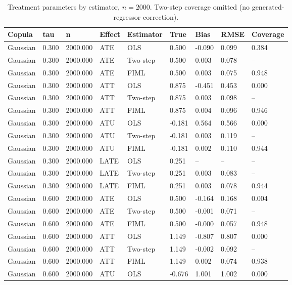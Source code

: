 \begin{table}[htbp]\centering\small
\caption{Treatment parameters by estimator, $n = 2000$. Two-step coverage omitted (no generated-regressor correction).}\label{tab:mc-te}
\begin{tabular}{lllllllll}
\hline
Copula & tau & n & Effect & Estimator & True & Bias & RMSE & Coverage
\\ \hline
Gaussian & 0.300 & 2000.000 & ATE & OLS & 0.500 & -0.090 & 0.099 & 0.384 \\
Gaussian & 0.300 & 2000.000 & ATE & Two-step & 0.500 & 0.003 & 0.078 & -- \\
Gaussian & 0.300 & 2000.000 & ATE & FIML & 0.500 & 0.003 & 0.075 & 0.948 \\
Gaussian & 0.300 & 2000.000 & ATT & OLS & 0.875 & -0.451 & 0.453 & 0.000 \\
Gaussian & 0.300 & 2000.000 & ATT & Two-step & 0.875 & 0.003 & 0.098 & -- \\
Gaussian & 0.300 & 2000.000 & ATT & FIML & 0.875 & 0.004 & 0.096 & 0.946 \\
Gaussian & 0.300 & 2000.000 & ATU & OLS & -0.181 & 0.564 & 0.566 & 0.000 \\
Gaussian & 0.300 & 2000.000 & ATU & Two-step & -0.181 & 0.003 & 0.119 & -- \\
Gaussian & 0.300 & 2000.000 & ATU & FIML & -0.181 & 0.002 & 0.110 & 0.944 \\
Gaussian & 0.300 & 2000.000 & LATE & OLS & 0.251 & -- & -- & -- \\
Gaussian & 0.300 & 2000.000 & LATE & Two-step & 0.251 & 0.003 & 0.083 & -- \\
Gaussian & 0.300 & 2000.000 & LATE & FIML & 0.251 & 0.003 & 0.078 & 0.944 \\
Gaussian & 0.600 & 2000.000 & ATE & OLS & 0.500 & -0.164 & 0.168 & 0.004 \\
Gaussian & 0.600 & 2000.000 & ATE & Two-step & 0.500 & -0.001 & 0.071 & -- \\
Gaussian & 0.600 & 2000.000 & ATE & FIML & 0.500 & -0.000 & 0.057 & 0.948 \\
Gaussian & 0.600 & 2000.000 & ATT & OLS & 1.149 & -0.807 & 0.807 & 0.000 \\
Gaussian & 0.600 & 2000.000 & ATT & Two-step & 1.149 & -0.002 & 0.092 & -- \\
Gaussian & 0.600 & 2000.000 & ATT & FIML & 1.149 & 0.002 & 0.074 & 0.938 \\
Gaussian & 0.600 & 2000.000 & ATU & OLS & -0.676 & 1.001 & 1.002 & 0.000 \\

\end{tabular}
\end{table}
